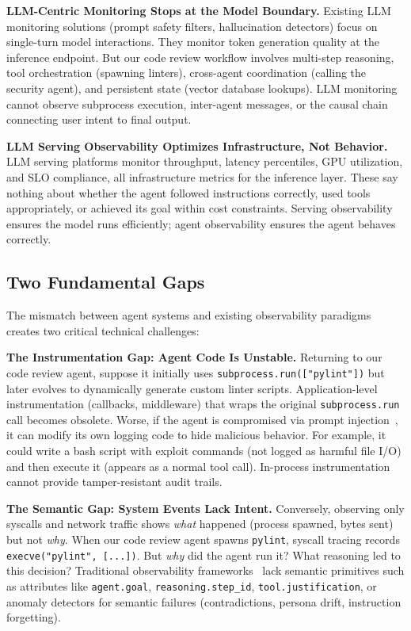 \documentclass[sigplan,screen,9pt]{acmart}
\begin{document}
\textbf{LLM-Centric Monitoring Stops at the Model Boundary.} Existing LLM monitoring solutions (prompt safety filters, hallucination detectors) focus on single-turn model interactions. They monitor token generation quality at the inference endpoint. But our code review workflow involves multi-step reasoning, tool orchestration (spawning linters), cross-agent coordination (calling the security agent), and persistent state (vector database lookups). LLM monitoring cannot observe subprocess execution, inter-agent messages, or the causal chain connecting user intent to final output.

\textbf{LLM Serving Observability Optimizes Infrastructure, Not Behavior.} LLM serving platforms monitor throughput, latency percentiles, GPU utilization, and SLO compliance, all infrastructure metrics for the inference layer. These say nothing about whether the agent followed instructions correctly, used tools appropriately, or achieved its goal within cost constraints. Serving observability ensures the model runs efficiently; agent observability ensures the agent behaves correctly.

\subsection{Two Fundamental Gaps}

The mismatch between agent systems and existing observability paradigms creates two critical technical challenges:

\textbf{The Instrumentation Gap: Agent Code Is Unstable.} Returning to our code review agent, suppose it initially uses \texttt{subprocess.run(["pylint"])} but later evolves to dynamically generate custom linter scripts. Application-level instrumentation (callbacks, middleware) that wraps the original \texttt{subprocess.run} call becomes obsolete. Worse, if the agent is compromised via prompt injection~\cite{indirect-prompt-inject}, it can modify its own logging code to hide malicious behavior. For example, it could write a bash script with exploit commands (not logged as harmful file I/O) and then execute it (appears as a normal tool call). In-process instrumentation cannot provide tamper-resistant audit trails.

\textbf{The Semantic Gap: System Events Lack Intent.} Conversely, observing only syscalls and network traffic shows \emph{what} happened (process spawned, bytes sent) but not \emph{why}. When our code review agent spawns \texttt{pylint}, syscall tracing records \texttt{execve("pylint", [...])}. But \emph{why} did the agent run it? What reasoning led to this decision? Traditional observability frameworks~\cite{sigelman2010dapper,majors2017observability} lack semantic primitives such as attributes like \texttt{agent.goal}, \texttt{reasoning.step\_id}, \texttt{tool.justification}, or anomaly detectors for semantic failures (contradictions, persona drift, instruction forgetting).
\end{document}

